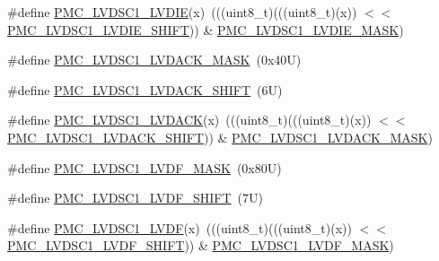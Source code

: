 \begin{DoxyCompactItemize}
\item 
\#define \mbox{\hyperlink{group___p_m_c___register___masks_gaca76bd97c7883297f5b00061a1cc0578}{P\+M\+C\+\_\+\+L\+V\+D\+S\+C1\+\_\+\+L\+V\+D\+IE}}(x)~(((uint8\+\_\+t)(((uint8\+\_\+t)(x)) $<$$<$ \mbox{\hyperlink{group___p_m_c___register___masks_ga30ca240c9254a7e76123a3cf2bfdc40e}{P\+M\+C\+\_\+\+L\+V\+D\+S\+C1\+\_\+\+L\+V\+D\+I\+E\+\_\+\+S\+H\+I\+FT}})) \& \mbox{\hyperlink{group___p_m_c___register___masks_ga1e7518c88ea0037d099124a643788363}{P\+M\+C\+\_\+\+L\+V\+D\+S\+C1\+\_\+\+L\+V\+D\+I\+E\+\_\+\+M\+A\+SK}})
\item 
\#define \mbox{\hyperlink{group___p_m_c___register___masks_ga65d04677ca16ad916563d6673cb8ecaa}{P\+M\+C\+\_\+\+L\+V\+D\+S\+C1\+\_\+\+L\+V\+D\+A\+C\+K\+\_\+\+M\+A\+SK}}~(0x40\+U)
\item 
\#define \mbox{\hyperlink{group___p_m_c___register___masks_ga56654042b7934ca0e6c51f21db7d1201}{P\+M\+C\+\_\+\+L\+V\+D\+S\+C1\+\_\+\+L\+V\+D\+A\+C\+K\+\_\+\+S\+H\+I\+FT}}~(6\+U)
\item 
\#define \mbox{\hyperlink{group___p_m_c___register___masks_gaac6d13822cd8df0c6dcd9538aa820a6b}{P\+M\+C\+\_\+\+L\+V\+D\+S\+C1\+\_\+\+L\+V\+D\+A\+CK}}(x)~(((uint8\+\_\+t)(((uint8\+\_\+t)(x)) $<$$<$ \mbox{\hyperlink{group___p_m_c___register___masks_ga56654042b7934ca0e6c51f21db7d1201}{P\+M\+C\+\_\+\+L\+V\+D\+S\+C1\+\_\+\+L\+V\+D\+A\+C\+K\+\_\+\+S\+H\+I\+FT}})) \& \mbox{\hyperlink{group___p_m_c___register___masks_ga65d04677ca16ad916563d6673cb8ecaa}{P\+M\+C\+\_\+\+L\+V\+D\+S\+C1\+\_\+\+L\+V\+D\+A\+C\+K\+\_\+\+M\+A\+SK}})
\item 
\#define \mbox{\hyperlink{group___p_m_c___register___masks_ga44ae12d2d3e732cd25a897092a7e9ada}{P\+M\+C\+\_\+\+L\+V\+D\+S\+C1\+\_\+\+L\+V\+D\+F\+\_\+\+M\+A\+SK}}~(0x80\+U)
\item 
\#define \mbox{\hyperlink{group___p_m_c___register___masks_ga75efd4534766aaa126efff96d241de61}{P\+M\+C\+\_\+\+L\+V\+D\+S\+C1\+\_\+\+L\+V\+D\+F\+\_\+\+S\+H\+I\+FT}}~(7\+U)
\item 
\#define \mbox{\hyperlink{group___p_m_c___register___masks_ga9deb83dbe1f7f6415f842750016bd408}{P\+M\+C\+\_\+\+L\+V\+D\+S\+C1\+\_\+\+L\+V\+DF}}(x)~(((uint8\+\_\+t)(((uint8\+\_\+t)(x)) $<$$<$ \mbox{\hyperlink{group___p_m_c___register___masks_ga75efd4534766aaa126efff96d241de61}{P\+M\+C\+\_\+\+L\+V\+D\+S\+C1\+\_\+\+L\+V\+D\+F\+\_\+\+S\+H\+I\+FT}})) \& \mbox{\hyperlink{group___p_m_c___register___masks_ga44ae12d2d3e732cd25a897092a7e9ada}{P\+M\+C\+\_\+\+L\+V\+D\+S\+C1\+\_\+\+L\+V\+D\+F\+\_\+\+M\+A\+SK}})
\end{DoxyCompactItemize}
